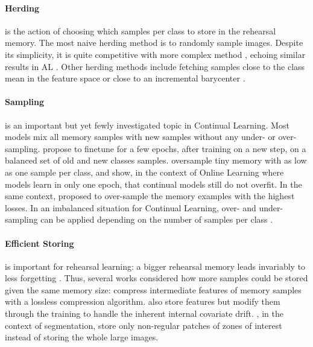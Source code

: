\paragraph{Herding} is the action of choosing which samples per class to store in the rehearsal
memory. The most naive herding method is to randomly sample images. Despite its simplicity, it is
quite competitive with more complex method \citep{castro2018end_to_end_inc_learn}, echoing similar
results in \ac{AL} \citep{gal2017activelearning}. Other herding methods include fetching samples
close to the class mean in the feature space \citep{castro2018end_to_end_inc_learn} or close to an
incremental barycenter \citep{rebuffi2017icarl}.

\paragraph{Sampling} is an important but yet fewly investigated topic in Continual Learning. Most
models mix all memory samples with new samples without any under- or over-sampling.
\cite{castro2018end_to_end_inc_learn} propose to finetune for a few epochs, after training on a new
step, on a balanced set of old and new classes samples. \cite{chaudhry2019tinyepisodicmemories}
oversample tiny memory with as low as one sample per class, and show, in the context of Online
Learning where models learn in only one epoch, that continual models still do not overfit. In the
same context, \cite{aljundi2019maximallyinterfered} proposed to over-sample the memory examples with
the highest losses. In an imbalanced situation for Continual Learning, over- and under-sampling can be
applied depending on the number of samples per class \citep{kim2020imbalancedcontinual}.

\paragraph{Efficient Storing} is important for rehearsal learning: a bigger rehearsal memory leads
invariably to less forgetting \citep{douillard2020podnet}. Thus, several works considered how more
samples could be stored given the same memory size: \cite{hayes2020remind} compress intermediate
features of memory samples with a lossless compression algorithm.
\cite{iscen2020incrementalfeatureadaptation} also store features but modify them through the
training to handle the inherent internal covariate drift. \cite{douillard2021objectrehearsal}, in
the context of segmentation, store only non-regular patches of zones of interest instead of storing
the whole large images.

